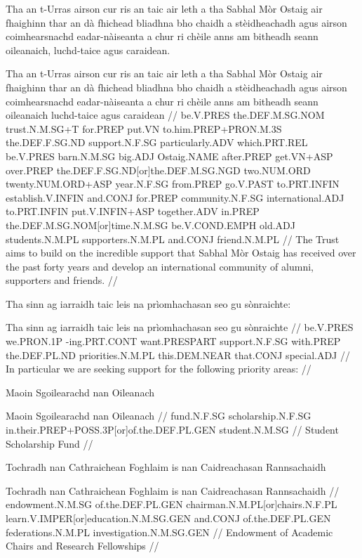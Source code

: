 \documentclass[a4paper,10pt]{article}
\begin{document}
\ex
\begingl
\glpre Tha an t-Urras airson cur ris an taic air leth a tha Sabhal Mòr Ostaig air fhaighinn thar an dà fhichead bliadhna bho chaidh a stèidheachadh agus airson coimhearsnachd eadar-nàiseanta a chur ri chèile anns am bitheadh seann oileanaich, luchd-taice agus caraidean. 

\vspace{4mm}
\gla Tha an t-Urras airson cur ris an taic {air leth} a tha Sabhal Mòr Ostaig air fhaighinn thar an dà fhichead bliadhna bho chaidh a stèidheachadh agus airson coimhearsnachd eadar-nàiseanta a chur {ri chèile} anns am bitheadh seann oileanaich luchd-taice agus caraidean  //
\glb be.V.PRES the.DEF.M.SG.NOM trust.N.M.SG+T for.PREP put.VN to.him.PREP+PRON.M.3S the.DEF.F.SG.ND support.N.F.SG particularly.ADV which.PRT.REL be.V.PRES barn.N.M.SG big.ADJ Ostaig.NAME after.PREP get.VN+ASP over.PREP the.DEF.F.SG.ND[or]the.DEF.M.SG.NGD two.NUM.ORD twenty.NUM.ORD+ASP year.N.F.SG from.PREP go.V.PAST to.PRT.INFIN establish.V.INFIN and.CONJ for.PREP community.N.F.SG international.ADJ to.PRT.INFIN put.V.INFIN+ASP together.ADV in.PREP the.DEF.M.SG.NOM[or]time.N.M.SG be.V.COND.EMPH old.ADJ students.N.M.PL supporters.N.M.PL and.CONJ friend.N.M.PL  //
\glft The Trust aims to build on the incredible support that Sabhal Mòr Ostaig has received over the past forty years and develop an international community of alumni, supporters and friends. //
\endgl
\xe

\ex
\begingl
\glpre Tha sinn ag iarraidh taic leis na prìomhachasan seo gu sònraichte: 

\vspace{4mm}
\gla Tha sinn ag iarraidh taic leis na prìomhachasan seo gu sònraichte  //
\glb be.V.PRES we.PRON.1P -ing.PRT.CONT want.PRESPART support.N.F.SG with.PREP the.DEF.PL.ND priorities.N.M.PL this.DEM.NEAR that.CONJ special.ADJ  //
\glft In particular we are seeking support for the following priority areas: //
\endgl
\xe

\ex
\begingl
\glpre Maoin Sgoilearachd nan Oileanach 

\vspace{4mm}
\gla Maoin Sgoilearachd nan Oileanach  //
\glb fund.N.F.SG scholarship.N.F.SG in.their.PREP+POSS.3P[or]of.the.DEF.PL.GEN student.N.M.SG  //
\glft Student Scholarship Fund //
\endgl
\xe

\ex
\begingl
\glpre Tochradh nan Cathraichean Foghlaim is nan Caidreachasan Rannsachaidh 

\vspace{4mm}
\gla Tochradh nan Cathraichean Foghlaim is nan Caidreachasan Rannsachaidh  //
\glb endowment.N.M.SG of.the.DEF.PL.GEN chairman.N.M.PL[or]chairs.N.F.PL learn.V.IMPER[or]education.N.M.SG.GEN and.CONJ of.the.DEF.PL.GEN federations.N.M.PL investigation.N.M.SG.GEN  //
\glft Endowment of Academic Chairs and Research Fellowships //
\endgl
\xe
\end{document}
